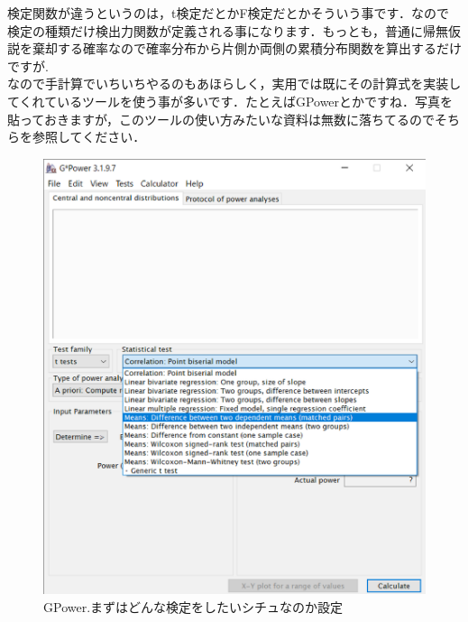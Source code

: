 \documentclass[11pt,a4paper]{ujreport} 	%
\begin{document}
検定関数が違うというのは，t検定だとかF検定だとかそういう事です．なので検定の種類だけ検出力関数が定義される事になります．もっとも，普通に帰無仮説を棄却する確率なので確率分布から片側か両側の累積分布関数を算出するだけですが.\\

なので手計算でいちいちやるのもあほらしく，実用では既にその計算式を実装してくれているツールを使う事が多いです．たとえばGPowerとかですね．写真を貼っておきますが，このツールの使い方みたいな資料は無数に落ちてるのでそちらを参照してください．\\

\begin{figure}[H]
  \centering
  \includegraphics[width=12cm]{../figures/gpower1.eps}
  \caption{GPower.まずはどんな検定をしたいシチュなのか設定}
\end{figure}
\end{document}
